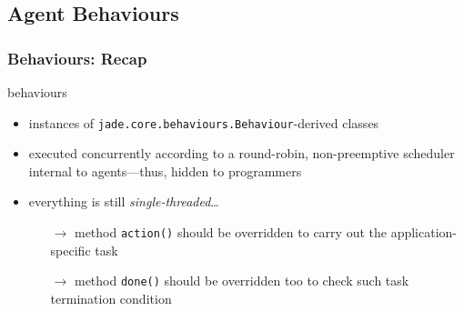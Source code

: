 \documentclass{beamer}\mode<presentation>{\usetheme{AMSCesenaPurpleAndGold}}
\begin{document}
\subsection{Agent Behaviours}

\begin{frame}\frametitle{\jade{} Behaviours: Recap}
    \begin{block}{\jade{} behaviours}
        \begin{itemize}
            \item instances of \alert{\texttt{jade.core.behaviours.Behaviour}}-derived classes
            \item executed concurrently according to a \alert{round-robin, non-preemptive} scheduler internal to agents---thus, hidden to programmers
            \item everything is still \emph{single-threaded}\ldots
            \begin{itemize}
                \item[$\rightarrow$] method \alert{\texttt{action()}} should be overridden to carry out the application-specific task
                \item[$\rightarrow$] method \alert{\texttt{done()}} should be overridden too to check such task termination condition
            \end{itemize}
        \end{itemize}
    \end{block}
\end{frame}
\end{document}
